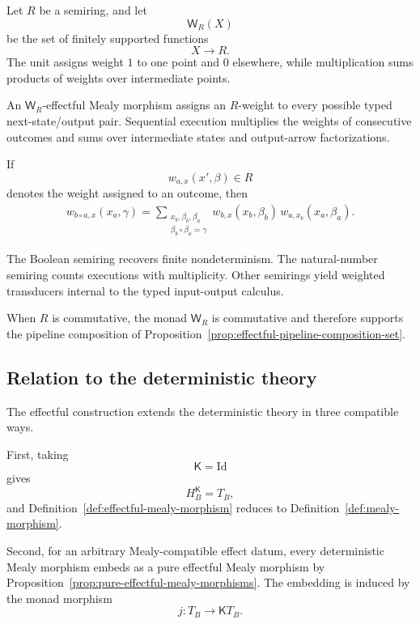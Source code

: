 \begin{example}
\label{example:semiring-weighted-mealy-morphisms}
    Let \(R\) be a semiring, and let
    \[
        \mathsf W_R(X)
    \]
    be the set of finitely supported functions
    \[
        X\to R.
    \]
    The unit assigns weight \(1\) to one point and \(0\) elsewhere, while
    multiplication sums products of weights over intermediate points.

    An \(\mathsf W_R\)-effectful Mealy morphism assigns an \(R\)-weight to
    every possible typed next-state/output pair. Sequential execution
    multiplies the weights of consecutive outcomes and sums over intermediate
    states and output-arrow factorizations.

    If
    \[
        w_{a,x}(x',\beta)\in R
    \]
    denotes the weight assigned to an outcome, then
    \[
    \begin{aligned}
        w_{b\circ a,x}(x_a,\gamma)
        =
        \sum_{\substack{
            x_b,\beta_b,\beta_a\\
            \beta_b\circ\beta_a=\gamma
        }}
        w_{b,x}(x_b,\beta_b)\,
        w_{a,x_b}(x_a,\beta_a).
    \end{aligned}
    \]

    The Boolean semiring recovers finite nondeterminism. The natural-number
    semiring counts executions with multiplicity. Other semirings yield
    weighted transducers internal to the typed input-output calculus.

    When \(R\) is commutative, the monad \(\mathsf W_R\) is commutative and
    therefore supports the pipeline composition of
    Proposition~\ref{prop:effectful-pipeline-composition-set}.
\end{example}

\subsection{Relation to the deterministic theory}
\label{subsec:effectful-relation-deterministic-theory}

The effectful construction extends the deterministic theory in three
compatible ways.

First, taking
\[
    \mathsf K=\mathrm{Id}
\]
gives
\[
    H_B^{\mathsf K}=T_B,
\]
and Definition~\ref{def:effectful-mealy-morphism} reduces to
Definition~\ref{def:mealy-morphism}.

Second, for an arbitrary Mealy-compatible effect datum, every deterministic
Mealy morphism embeds as a pure effectful Mealy morphism by
Proposition~\ref{prop:pure-effectful-mealy-morphisms}. The embedding is induced
by the monad morphism
\[
    j:
    T_B
    \longrightarrow
    \mathsf K T_B.
\]

